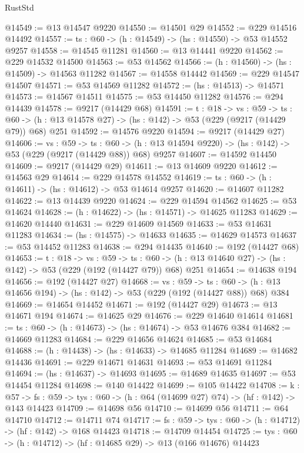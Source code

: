 \begin{lexlean}{RustStd}
\begin{coremodule}
@14549 := @13 @14547 @9220
@14550 := @14501 @29
@14552 := @229 @14516 @14492
@14557 := {ts : @60} -> (h : @14549) -> (hs : @14550) -> @53 @14552 @9257
@14558 := @14545 @11281
@14560 := @13 @14441 @9220
@14562 := @229 @14532 @14500
@14563 := @53 @14562
@14566 := (h : @14560) -> (hs : @14509) -> @14563 @11282
@14567 := @14558 @14442
@14569 := @229 @14547 @14507
@14571 := @53 @14569 @11282
@14572 := (hs : @14513) -> @14571
@14573 := @14567 @14511
@14575 := @53 @14450 @11282
@14576 := @294 @14439
@14578 := @9217 (@14429 @68)
@14591 := {t : @18} ->
  {vs : @59} ->
  {ts : @60} -> (h : @13 @14578 @27) -> (hs : @142) -> @53 (@229 (@9217 (@14429 @79)) @68) @251
@14592 := @14576 @9220
@14594 := @9217 (@14429 @27)
@14606 := {vs : @59} ->
  {ts : @60} -> (h : @13 @14594 @9220) -> (hs : @142) -> @53 (@229 (@9217 (@14429 @88)) @68) @9257
@14607 := @14592 @14450
@14609 := @9217 (@14429 @29)
@14611 := @13 @14609 @9220
@14612 := @14563 @29
@14614 := @229 @14578 @14552
@14619 := {ts : @60} -> (h : @14611) -> (hs : @14612) -> @53 @14614 @9257
@14620 := @14607 @11282
@14622 := @13 @14439 @9220
@14624 := @229 @14594 @14562
@14625 := @53 @14624
@14628 := (h : @14622) -> (hs : @14571) -> @14625 @11283
@14629 := @14620 @14440
@14631 := @229 @14609 @14569
@14633 := @53 @14631 @11283
@14634 := (hs : @14575) -> @14633
@14635 := @14629 @14573
@14637 := @53 @14452 @11283
@14638 := @294 @14435
@14640 := @192 (@14427 @68)
@14653 := {t : @18} ->
  {vs : @59} ->
  {ts : @60} -> (h : @13 @14640 @27) -> (hs : @142) -> @53 (@229 (@192 (@14427 @79)) @68) @251
@14654 := @14638 @194
@14656 := @192 (@14427 @27)
@14668 := {vs : @59} ->
  {ts : @60} -> (h : @13 @14656 @194) -> (hs : @142) -> @53 (@229 (@192 (@14427 @88)) @68) @384
@14669 := @14654 @14452
@14671 := @192 (@14427 @29)
@14673 := @13 @14671 @194
@14674 := @14625 @29
@14676 := @229 @14640 @14614
@14681 := {ts : @60} -> (h : @14673) -> (hs : @14674) -> @53 @14676 @384
@14682 := @14669 @11283
@14684 := @229 @14656 @14624
@14685 := @53 @14684
@14688 := (h : @14438) -> (hs : @14633) -> @14685 @11284
@14689 := @14682 @14436
@14691 := @229 @14671 @14631
@14693 := @53 @14691 @11284
@14694 := (hs : @14637) -> @14693
@14695 := @14689 @14635
@14697 := @53 @14454 @11284
@14698 := @140 @14422
@14699 := @105 @14422
@14708 := {k : @57} ->
  {fs : @59} -> {tys : @60} -> (h : @64 (@14699 @27) @74) -> (hf : @142) -> @143 @14423
@14709 := @14698 @56
@14710 := @14699 @56
@14711 := @64 @14710
@14712 := @14711 @74
@14717 := {fs : @59} -> {tys : @60} -> (h : @14712) -> (hf : @142) -> @168 @14423
@14718 := @14709 @14454
@14725 := {tys : @60} -> (h : @14712) -> (hf : @14685 @29) -> @13 (@166 @14676) @14423

\end{coremodule}
\end{lexlean}

